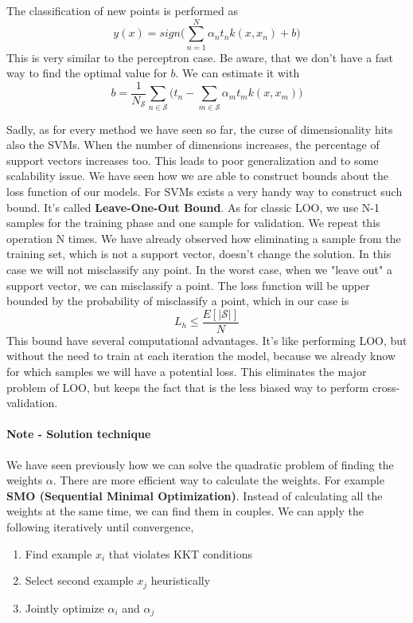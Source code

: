 \documentclass[main.tex]{subfiles}
\begin{document}
\newline
The classification of new points is performed as
\begin{equation}
    y(x) = sign \bigg( \sum_{n=1}^N \alpha_n t_n k(x, x_n) +b \bigg)
\end{equation}
This is very similar to the perceptron case. Be aware, that we don't have a fast way to find the optimal value for $b$. We can estimate it with
\begin{equation*}
    b = \frac{1}{N_\mathcal{S}} \sum_{n \in \mathcal{S}} \bigg( t_n - \sum_{m \in \mathcal{S}} \alpha_m t_m k(x,x_m) \bigg)
\end{equation*}

Sadly, as for every method we have seen so far, the curse of dimensionality hits also the SVMs. When the number of dimensions increases, the percentage of support vectors increases too. This leads to poor generalization and to some scalability issue.
We have seen how we are able to construct bounds about the loss function of our models. For SVMs exists a very handy way to construct such bound. It's called \textbf{Leave-One-Out Bound}.
As for classic LOO, we use N-1 samples for the training phase and one sample for validation. We repeat this operation N times. We have already observed how eliminating a sample from the training set, which is not a support vector, doesn't change the solution. In this case we will not misclassify any point. In the worst case, when we "leave out" a support vector, we can misclassify a point. The loss function will be upper bounded by the probability of misclassify a point, which in our case is \footnotemark {}
\begin{equation}
    L_h \leq \frac{E[|\mathcal{S}|]}{N}
\end{equation}
This bound have several computational advantages. It's like performing LOO, but without the need to train at each iteration the model, because we already know for which samples we will have a potential loss. This eliminates the major problem of LOO, but keeps the fact that is the less biased way to perform cross-validation.

\paragraph{Note - Solution technique} We have seen previously how we can solve the quadratic problem of finding the weights $\alpha$. There are more efficient way to calculate the weights. For example \textbf{SMO (Sequential Minimal Optimization)}.
Instead of calculating all the weights at the same time, we can find them in couples\footnotemark. We can apply the following iteratively until convergence,
\begin{enumerate}
    \item Find example $x_i$ that violates KKT conditions
    \item Select second example $x_j$ heuristically
    \item Jointly optimize $\alpha_i$ and $\alpha_j$
\end{enumerate}
\end{document}
